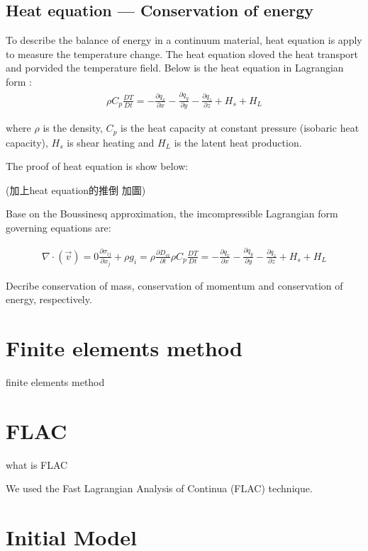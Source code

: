 \subsection{Heat equation --- Conservation of energy}

To describe the balance of energy in a continuum material, heat equation is apply to measure the temperature change. The heat equation sloved the heat transport and porvided the temperature field. Below is the heat equation in Lagrangian form :
\begin{align}
\rho C_p \frac{DT}{Dt} = -\frac{\partial q_x}{\partial x}-\frac{\partial q_y}{\partial y}-\frac{\partial q_z}{\partial z}+H_s+H_L
\end{align}

where $\rho$ is the density, $C_p$ is the heat capacity at constant pressure (isobaric heat capacity), $H_s$ is shear heating and $H_L$ is the latent heat production.

The proof of heat equation is show below:

(加上heat equation的推倒
加圖)


Base on the Boussinesq approximation, the imcompressible Lagrangian form governing equations are:

\begin{align}
\nabla \cdot (\vec v) = 0 
\frac{\partial \sigma_{ij}}{\partial x_j}+\rho g_i = \rho \frac{\partial D_{vi}}{\partial t}
\rho C_p \frac{DT}{Dt} = -\frac{\partial q_x}{\partial x}-\frac{\partial q_y}{\partial y}-\frac{\partial q_z}{\partial z}+H_s+H_L
\end{align}

Decribe conservation of mass, conservation of momentum and conservation of energy, respectively.


\section{Finite elements method}

finite elements method

\section{FLAC}

what is FLAC

We used the Fast Lagrangian Analysis of Continua (FLAC) technique.

\section{Initial Model}

